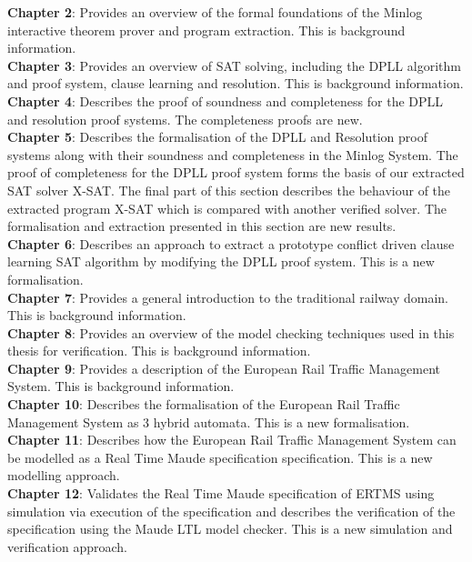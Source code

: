 \textbf{Chapter 2}: Provides an overview of the formal foundations of the Minlog interactive theorem prover and program extraction. This is background information.
\medskip \\
\textbf{Chapter 3}: Provides an overview of SAT solving, including the DPLL algorithm and  proof system, clause learning and resolution. This is background information.
\medskip \\
\textbf{Chapter 4}: Describes the proof of soundness and completeness for the DPLL and resolution proof systems. The completeness proofs are new.
\medskip  \\
\textbf{Chapter 5}: Describes the formalisation of the DPLL and Resolution proof systems along with their soundness and completeness in the Minlog System. The proof of completeness for the DPLL proof system forms the basis of our extracted SAT solver X-SAT. The final part of this section describes the behaviour of the extracted program X-SAT which is compared with another verified solver. The formalisation and extraction presented in this section are new results.
\medskip \\ 
\textbf{Chapter 6}: Describes an approach to extract a prototype conflict driven clause learning SAT algorithm by modifying the DPLL proof system. This is a new formalisation.
\medskip \\
\textbf{Chapter 7}: Provides a general introduction to the traditional railway domain. This is background information.
\medskip \\
\textbf{Chapter 8}: Provides an overview of the model checking techniques used in this thesis for verification. This is background information. \medskip \\
\textbf{Chapter 9}: Provides a description of the European Rail Traffic Management System. This is background information.
\medskip \\
\textbf{Chapter 10}: Describes the formalisation of the European Rail Traffic Management System as 3 hybrid automata. This is a new formalisation.
\medskip \\
\textbf{Chapter 11}: Describes how the European Rail Traffic Management System can be modelled as a Real Time Maude specification  specification. This is a new modelling approach.
\medskip \\
\textbf{Chapter 12}: Validates the Real Time Maude specification of ERTMS using simulation via execution of the specification and describes the verification of the specification using the Maude LTL model checker. This is a new simulation and verification approach.


